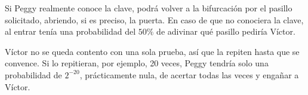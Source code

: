 Si Peggy realmente conoce la clave, podrá volver a la bifurcación por el pasillo solicitado, abriendo, si es preciso, la puerta.
En caso de que no conociera la clave, al entrar tenía una probabilidad del $50\%$ de adivinar qué pasillo pediría Víctor.



Víctor no se queda contento con una sola prueba, así que la repiten hasta que se convence. Si lo repitieran, por ejemplo, 20 veces, Peggy tendría solo una probabilidad de $2^{-20}$, prácticamente nula, de acertar todas las veces y engañar a Víctor.


